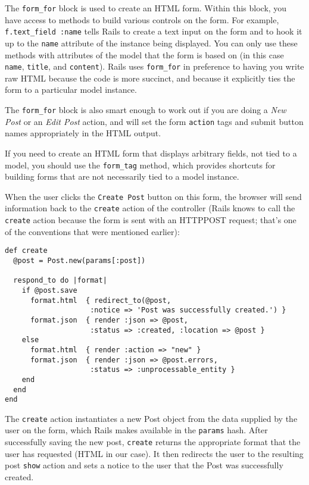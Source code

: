 \documentclass[10pt]{book}
\begin{document}
The \texttt{form\_for} block is used to create an HTML form. Within this block, you have access to methods to build various controls on the form. For example, \texttt{f.text\_field :name} tells Rails to create a text input on the form and to hook it up to the \texttt{name} attribute of the instance being displayed. You can only use these methods with attributes of the model that the form is based on (in this case \texttt{name}, \texttt{title}, and \texttt{content}). Rails uses \texttt{form\_for} in preference to having you write raw HTML because the code is more succinct, and because it explicitly ties the form to a particular model instance.

The \texttt{form\_for} block is also smart enough to work out if you are doing a \emph{New Post} or an \emph{Edit Post} action, and will set the form \texttt{action} tags and submit button names appropriately in the HTML output.

If you need to create an HTML form that displays arbitrary fields, not tied to a model, you should use the \texttt{form\_tag} method, which provides shortcuts for building forms that are not necessarily tied to a model instance.

When the user clicks the \texttt{Create Post} button on this form, the browser will send information back to the \texttt{create} action of the controller (Rails knows to call the \texttt{create} action because the form is sent with an HTTPPOST request; that’s one of the conventions that were mentioned earlier):


\begin{verbatim}
def create
  @post = Post.new(params[:post])
 
  respond_to do |format|
    if @post.save
      format.html  { redirect_to(@post,
                    :notice => 'Post was successfully created.') }
      format.json  { render :json => @post,
                    :status => :created, :location => @post }
    else
      format.html  { render :action => "new" }
      format.json  { render :json => @post.errors,
                    :status => :unprocessable_entity }
    end
  end
end
\end{verbatim}

The \texttt{create} action instantiates a new Post object from the data supplied by the user on the form, which Rails makes available in the \texttt{params} hash. After successfully saving the new post, \texttt{create} returns the appropriate format that the user has requested (HTML in our case). It then redirects the user to the resulting post \texttt{show} action and sets a notice to the user that the Post was successfully created.
\end{document}
